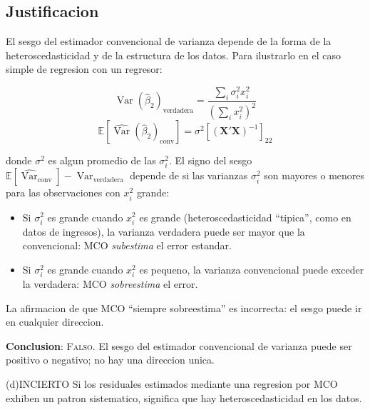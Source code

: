 \documentclass[12pt, letterpaper]{article}
\theoremstyle{remark}
\newcommand{\E}{\mathbb{E}}
\newcommand{\Var}{\operatorname{Var}}
\begin{document}
\subsection*{Justificacion}

El sesgo del estimador convencional de varianza depende de la forma de la
heteroscedasticidad y de la estructura de los datos. Para ilustrarlo en
el caso simple de regresion con un regresor:

\begin{equation}
  \Var(\hat\beta_2)_{\text{verdadera}}
    = \frac{\sum_i \sigma_i^2 x_i^2}{(\sum_i x_i^2)^2}
  \label{eq:var_verdadera}
\end{equation}
\begin{equation}
  \E[\widehat{\Var}(\hat\beta_2)_{\text{conv}}]
    = \sigma^2 [(\mathbf{X'X})^{-1}]_{22}
  \label{eq:var_conv_esp}
\end{equation}

donde $\sigma^2$ es algun promedio de las $\sigma_i^2$. El signo del sesgo
$\E[\widehat{\Var}_{\text{conv}}] - \Var_{\text{verdadera}}$ depende de si
las varianzas $\sigma_i^2$ son mayores o menores para las observaciones con
$x_i^2$ grande:

\begin{itemize}[leftmargin=1.6em, itemsep=4pt]
  \item Si $\sigma_i^2$ es grande cuando $x_i^2$ es grande (heteroscedasticidad
    ``tipica'', como en datos de ingresos), la varianza verdadera puede ser
    mayor que la convencional: MCO \emph{subestima} el error estandar.
  \item Si $\sigma_i^2$ es grande cuando $x_i^2$ es pequeno, la varianza
    convencional puede exceder la verdadera: MCO \emph{sobreestima} el error.
\end{itemize}

La afirmacion de que MCO ``siempre sobreestima'' es incorrecta: el sesgo puede
ir en cualquier direccion.

\textbf{Conclusion}: \textsc{Falso}. El sesgo del estimador convencional de
varianza puede ser positivo o negativo; no hay una direccion unica.

\bigskip

\begin{verdict}{(d)}{INCIERTO}
  Si los residuales estimados mediante una regresion por MCO exhiben un patron
  sistematico, significa que hay heteroscedasticidad en los datos.
\end{verdict}
\end{document}
